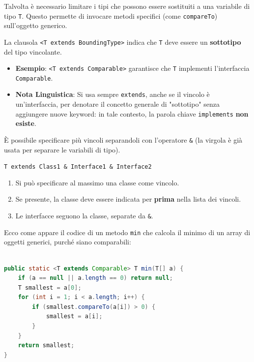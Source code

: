 Talvolta è necessario limitare i tipi che possono essere sostituiti a una variabile di tipo \texttt{T}. Questo permette di invocare metodi specifici (come \texttt{compareTo}) sull'oggetto generico.

La clausola \texttt{<T extends BoundingType>} indica che \texttt{T} deve essere un \textbf{sottotipo} del tipo vincolante.
\begin{itemize}
    \item \textbf{Esempio}: \texttt{<T extends Comparable>} garantisce che \texttt{T} implementi l'interfaccia \texttt{Comparable}.
    \item \textbf{Nota Linguistica}: Si usa sempre \texttt{extends}, anche se il vincolo è un'interfaccia, per denotare il concetto generale di "sottotipo" senza aggiungere nuove keyword: in tale contesto, la parola chiave \texttt{implements} \textbf{non esiste}. 
\end{itemize}

\medskip

È possibile specificare più vincoli separandoli con l'operatore \texttt{\&} (la virgola è già usata per separare le variabili di tipo).
\begin{center}
\texttt{T extends Class1 \& Interface1 \& Interface2}
\end{center}

\begin{warningbox}
\begin{enumerate}
    \item Si può specificare al massimo una classe come vincolo.
    \item Se presente, la classe deve essere indicata per \textbf{prima} nella lista dei vincoli.
    \item Le interfacce seguono la classe, separate da \texttt{\&}.
\end{enumerate}
\end{warningbox}

Ecco come appare il codice di un metodo \texttt{min} che calcola il minimo di un array di oggetti generici, purché siano comparabili:

\begin{lstlisting}[language=Java]
    
public static <T extends Comparable> T min(T[] a) {
    if (a == null || a.length == 0) return null;
    T smallest = a[0];
    for (int i = 1; i < a.length; i++) {
        if (smallest.compareTo(a[i]) > 0) {
            smallest = a[i];
        }
    }
    return smallest;
}
\end{lstlisting}

